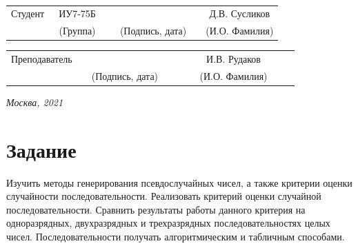 \documentclass[14pt, a4paper]{extarticle}
\begin{document}
	
	\noindent
	
	\noindent
	\\
	
	\vspace{1.5cm}
	\noindent
	\begin{tabular}{l c c c c c}
		Студент      & ~ИУ7-75Б~               & \hspace{2.5cm} & \hspace{2cm}                 & &  Д.В. 
		Сусликов \\\cline{2-2}\cline{4-4} \cline{6-6} 
		\hspace{3cm} & {\footnotesize(Группа)} &                & {\footnotesize(Подпись, дата)} & & {\footnotesize(И.О. Фамилия)}
	\end{tabular}
	
	\noindent
	\begin{tabular}{l c c c c}
		Преподаватель & \hspace{5cm}   & \hspace{2cm}                 & & ~~~~~~И.В. Рудаков~~~~~~\\\cline{3-3} \cline{5-5} 
		\hspace{3cm}  &                & {\footnotesize(Подпись, дата)} & & {\footnotesize(И.О. Фамилия)}
	\end{tabular}
	
	\vspace{0.6cm}
	\begin{center}	
		\vfill
		\large \textit {Москва, 2021}
	\end{center}
	
	\thispagestyle {empty}
	\pagebreak
	
	\clearpage
	\tableofcontents
		
	\clearpage
	\section*{Задание}
	Изучить методы генерирования псевдослучайных чисел, а также критерии оценки случайности последовательности. Реализовать критерий оценки случайной последовательности. Сравнить результаты работы данного критерия на одноразрядных, двухразрядных и трехразрядных последовательностях целых чисел. Последовательности получать алгоритмическим и табличным способами.
	
\end{document}
